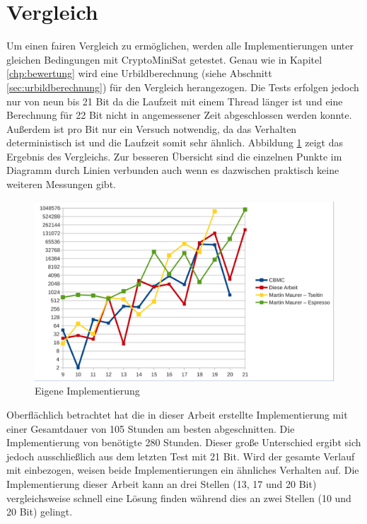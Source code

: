 \section{Vergleich}
\label{sec:vergleich}

Um einen fairen Vergleich zu ermöglichen, werden alle Implementierungen unter gleichen Bedingungen mit CryptoMiniSat
getestet. Genau wie in Kapitel \ref{chp:bewertung} wird eine Urbildberechnung (siehe Abschnitt \ref{sec:urbildberechnung})
für den Vergleich herangezogen. Die Tests erfolgen jedoch nur von neun bis 21 Bit da die Laufzeit mit einem Thread länger
ist und eine Berechnung für 22 Bit nicht in angemessener Zeit abgeschlossen werden konnte. Außerdem ist pro Bit nur ein
Versuch notwendig, da das Verhalten deterministisch ist und die Laufzeit somit sehr ähnlich. Abbildung \ref{fig:eval_final}
zeigt das Ergebnis des Vergleichs. Zur besseren Übersicht sind die einzelnen Punkte im Diagramm durch Linien verbunden auch
wenn es dazwischen praktisch keine weiteren Messungen gibt.
\begin{figure}[!h]
  \centering
  \includegraphics[scale=0.55]{images/eval_final}
  \caption{Eigene Implementierung}
  \label{fig:eval_final}
\end{figure}

Oberflächlich betrachtet hat die in dieser Arbeit erstellte Implementierung mit einer Gesamtdauer von 105 Stunden am besten abgeschnitten.
Die Implementierung von  benötigte 280  Stunden. Dieser große Unterschied ergibt sich jedoch ausschließlich aus dem
letzten Test mit 21 Bit. Wird der gesamte Verlauf mit einbezogen, weisen beide Implementierungen ein ähnliches Verhalten auf. Die
Implementierung dieser Arbeit kann an drei Stellen (13, 17 und 20 Bit) vergleichsweise schnell eine Lösung finden während  dies
an zwei Stellen (10 und 20 Bit) gelingt.

